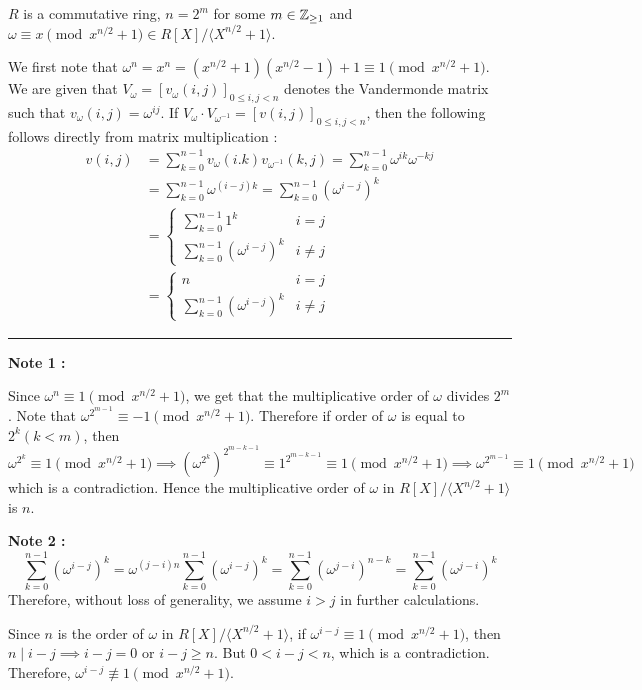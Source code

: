 $R$ is a commutative ring, $n=2^m$ for some $m\in \mathbb{Z}_{\geq 1}$ and $\omega \equiv x \pmod{x^{n/2}+1} \in R[X]/\langle X^{n/2}+1 \rangle$. 

We first note that $\omega^n = x^n = (x^{n/2}+1)(x^{n/2}-1)+1 \equiv 1 \pmod{x^{n/2}+1}$. We are given that $V_{\omega} = [v_{\omega}(i,j)]_{0\leq i,j<n}$ denotes the Vandermonde matrix such that $v_{\omega}(i,j)=\omega^{ij}$. 
If $V_{\omega}\cdot V_{\omega^{-1}} = [v(i,j)]_{0\leq i,j<n}$, then the following follows directly from matrix multiplication :
\begin{align*}
    v(i,j) &= \sum_{k=0}^{n-1} v_{\omega}(i.k)v_{\omega^{-1}}(k,j) =  \sum_{k=0}^{n-1} \omega^{ik}\omega^{-kj} \\
            &= \sum_{k=0}^{n-1} \omega^{(i-j)k} = \sum_{k=0}^{n-1} (\omega^{i-j})^k \\
            &= \begin{cases}
                \sum_{k=0}^{n-1} 1^k & i = j \\
                \sum_{k=0}^{n-1} (\omega^{i-j})^k & i\neq j 
            \end{cases} \\
            &= \begin{cases}
                n & i=j \\
                \sum_{k=0}^{n-1} (\omega^{i-j})^k & i\neq j
            \end{cases}
\end{align*}
\begin{center}
\rule{0.5\textwidth}{.4pt}
\end{center}
\begin{thisnote1}

\textbf{Note 1 :}

Since $\omega^n \equiv 1 \pmod{x^{n/2}+1}$, we get that the multiplicative order of $\omega$ divides $2^m$. Note that $\omega^{2^{m-1}} \equiv -1 \pmod{x^{n/2}+1}$. Therefore if order of $\omega$ is equal to $2^k (k<m)$, then $\omega^{2^k} \equiv 1 \pmod{x^{n/2}+1} \implies (\omega^{2^k})^{2^{m-k-1}} \equiv 1^{2^{m-k-1}} \equiv 1 \pmod{x^{n/2}+1} \implies \omega^{2^{m-1}} \equiv 1\pmod{x^{n/2}+1}$ which is a contradiction. Hence the multiplicative order of $\omega$ in $R[X]/\langle X^{n/2}+1 \rangle$ is $n$.


\textbf{Note 2 :} 
\[\sum_{k=0}^{n-1} (\omega^{i-j})^k = \omega^{(j-i)n}\sum_{k=0}^{n-1} (\omega^{i-j})^k = \sum_{k=0}^{n-1} (\omega^{j-i})^{n-k} = \sum_{k=0}^{n-1} (\omega^{j-i})^k\]
Therefore, without loss of generality, we assume $i>j$ in further calculations.

Since $n$ is the order of $\omega$ in $R[X]/\langle X^{n/2}+1 \rangle$, if $\omega^{i-j}\equiv 1 \pmod{x^{n/2}+1}$, then $n\mid i-j \implies i-j=0$ or $i-j\geq n$. But $0<i-j<n$, which is a contradiction. Therefore, $\omega^{i-j}\not\equiv 1\pmod{x^{n/2}+1}$.
\end{thisnote1}
